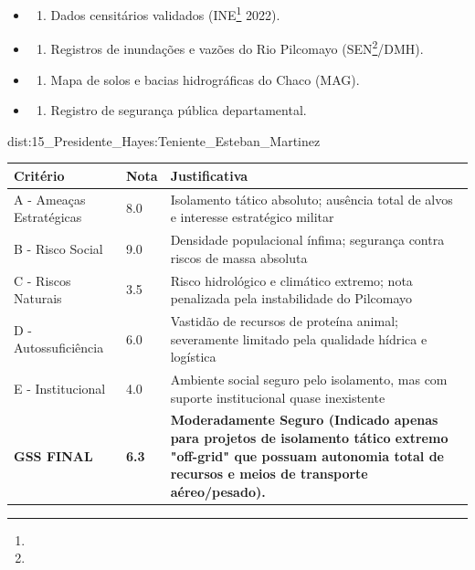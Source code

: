 {\begin{itemize}
\tightlist
\item
  \begin{enumerate}
  \def\labelenumi{\arabic{enumi})}
  \tightlist
  \item
    Dados censitários validados (INE\footnote{\fineINE} 2022).
  \end{enumerate}
\item
  \begin{enumerate}
  \def\labelenumi{\arabic{enumi})}
  \setcounter{enumi}{1}
  \tightlist
  \item
    Registros de inundações e vazões do Rio Pilcomayo (SEN\footnote{\fineSEN}/\allowbreak DMH).
  \end{enumerate}
\item
  \begin{enumerate}
  \def\labelenumi{\arabic{enumi})}
  \setcounter{enumi}{2}
  \tightlist
  \item
    Mapa de solos e bacias hidrográficas do Chaco (MAG).
  \end{enumerate}
\item
  \begin{enumerate}
  \def\labelenumi{\arabic{enumi})}
  \setcounter{enumi}{3}
  \tightlist
  \item
    Registro de segurança pública departamental.
  \end{enumerate}
\end{itemize}}{dist:15_Presidente_Hayes:Teniente_Esteban_Martinez}
\begin{table}[ht!]
\small \begin{tabular}{p{3.0cm}p{0.8cm}p{6.0cm}} \toprule
\textbf{Critério} & \textbf{Nota} & \textbf{Justificativa} \\ \midrule
A - Ameaças Estratégicas & 8.0 & Isolamento tático absoluto; ausência total de alvos e interesse estratégico militar \\
B - Risco Social & 9.0 & Densidade populacional ínfima; segurança contra riscos de massa absoluta \\
C - Riscos Naturais & 3.5 & Risco hidrológico e climático extremo; nota penalizada pela instabilidade do Pilcomayo \\
D - Autossuficiência & 6.0 & Vastidão de recursos de proteína animal; severamente limitado pela qualidade hídrica e logística \\
E - Institucional & 4.0 & Ambiente social seguro pelo isolamento, mas com suporte institucional quase inexistente \\
\midrule \textbf{GSS FINAL} & \textbf{6.3} & \textbf{Moderadamente Seguro (Indicado apenas para projetos de isolamento tático extremo "off-grid" que possuam autonomia total de recursos e meios de transporte aéreo/\allowbreak pesado).} \\ \bottomrule \end{tabular}
\end{table}
